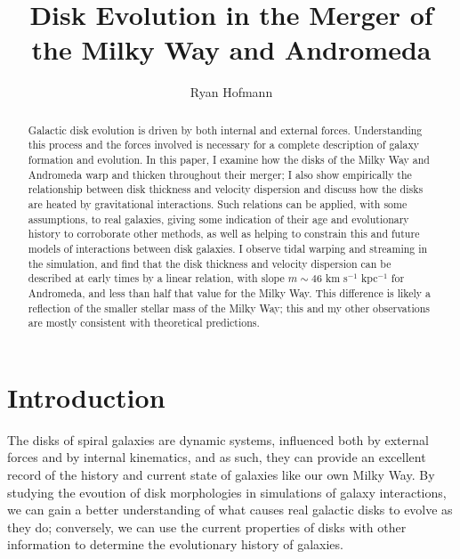 \documentclass[iop]{emulateapj}
\begin{document}
\title{Disk Evolution in the Merger of the Milky Way and Andromeda}

\author{Ryan Hofmann}

\begin{abstract}
Galactic disk evolution is driven by both internal and external forces. Understanding this process and the forces involved is necessary for a complete description of galaxy formation and evolution. In this paper, I examine how the disks of the Milky Way and Andromeda warp and thicken throughout their merger; I also show empirically the relationship between disk thickness and velocity dispersion and discuss how the disks are heated by gravitational interactions. Such relations can be applied, with some assumptions, to real galaxies, giving some indication of their age and evolutionary history to corroborate other methods, as well as helping to constrain this and future models of interactions between disk galaxies. I observe tidal warping and streaming in the simulation, and find that the disk thickness and velocity dispersion can be described at early times by a linear relation, with slope $m \sim 46$ km s$^{-1}$ kpc$^{-1}$ for Andromeda, and less than half that value for the Milky Way. This difference is likely a reflection of the smaller stellar mass of the Milky Way; this and my other observations are mostly consistent with theoretical predictions.
\end{abstract}

\section{Introduction}
The disks of spiral galaxies are dynamic systems, influenced both by external forces and by internal kinematics, and as such, they can provide an excellent record of the history and current state of galaxies like our own Milky Way. By studying the evoution of disk morphologies in simulations of galaxy interactions, we can gain a better understanding of what causes real galactic disks to evolve as they do; conversely, we can use the current properties of disks with other information to determine the evolutionary history of galaxies.
\end{document}
